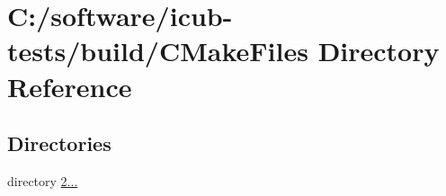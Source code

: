\section{C\+:/software/icub-\/tests/build/\+C\+Make\+Files Directory Reference}
\label{dir_63772b626f2709090f0bdca0f40827b4}
\subsection*{Directories}
\begin{DoxyCompactItemize}
\item 
directory \hyperlink{dir_da9d1f60b22a094d3f39025147373af5}{2...}
\end{DoxyCompactItemize}

